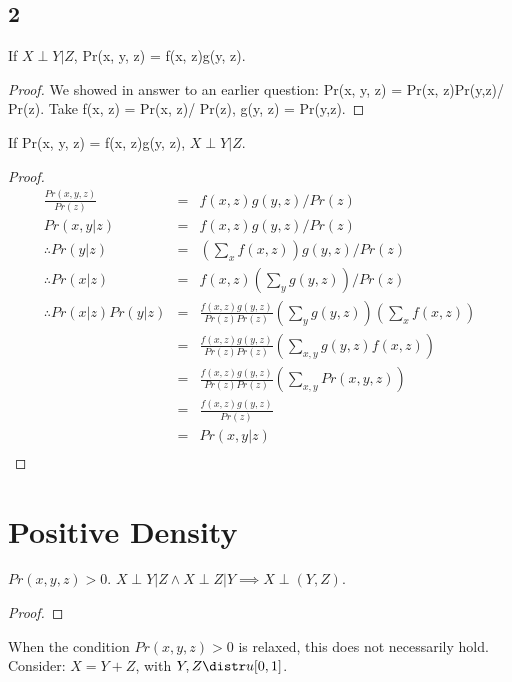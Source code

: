 \documentclass{article}
\begin{document}
\subsection{2}
\begin{lem}
If $X \perp Y | Z$, Pr(x, y, z) = f(x, z)g(y, z).
\end{lem}
\begin{proof}
We showed in answer to an earlier question: Pr(x, y, z) = Pr(x, z)Pr(y,z)/ Pr(z). Take f(x, z) = Pr(x, z)/ Pr(z), g(y, z) = Pr(y,z).
\end{proof}

\begin{lem}
If Pr(x, y, z) = f(x, z)g(y, z), $X \perp Y | Z$.
\end{lem}
\begin{proof}
\begin{eqnarray*}
\frac{Pr(x, y, z)}{Pr(z)} &=& f(x, z)g(y, z)/Pr(z) \\
Pr(x, y | z) &=& f(x, z)g(y, z)/Pr(z)\\
\therefore Pr(y | z) &=& (\sum_x f(x, z))g(y, z)/Pr(z)\\
\therefore Pr(x | z) &=& f(x, z) (\sum_y g(y, z))/Pr(z)\\
\therefore Pr(x | z)Pr(y|z) &=& \frac{f(x, z)g(y, z)}{Pr(z)Pr(z)} (\sum_y g(y, z))(\sum_x f(x, z))\\
&=& \frac{f(x, z)g(y, z)}{Pr(z)Pr(z)} (\sum_{x,y} g(y, z) f(x, z))\\
&=& \frac{f(x, z)g(y, z)}{Pr(z)Pr(z)} (\sum_{x,y} Pr(x, y, z))\\
&=& \frac{f(x, z)g(y, z)}{Pr(z)}\\
&=& Pr(x, y | z)\\
\end{eqnarray*}
\end{proof}



\section{Positive Density}
\begin{thm}
$Pr(x, y, z) > 0$. $X \perp Y | Z \land X \perp Z|Y \implies X\perp (Y, Z)$.
\end{thm}
\begin{proof}
\tbc
\end{proof}

\begin{rem}
When the condition $Pr(x, y, z) > 0$ is relaxed, this does not necessarily hold. Consider: $X = Y + Z$, with $Y, Z \distr u[0,1]$.
\end{rem}
\end{document}
